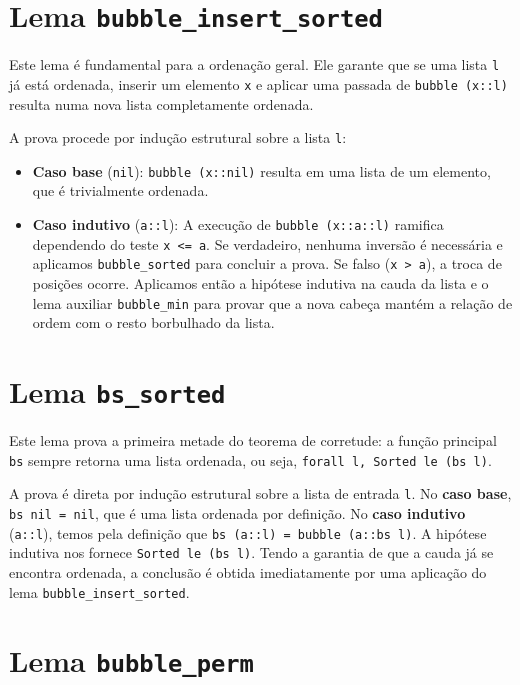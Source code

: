 \documentclass{article}
\begin{document}
\section*{Lema \texttt{bubble\_insert\_sorted}}

Este lema é fundamental para a ordenação geral. Ele garante que se uma lista
\texttt{l} já está ordenada, inserir um elemento \texttt{x} e aplicar uma
passada de \texttt{bubble (x::l)} resulta numa nova lista completamente
ordenada.

A prova procede por indução estrutural sobre a lista \texttt{l}:
\begin{itemize}
  \item \textbf{Caso base} (\texttt{nil}): \texttt{bubble (x::nil)} resulta
        em uma lista de um elemento, que é trivialmente ordenada.
  \item \textbf{Caso indutivo} (\texttt{a::l}): A execução de
        \texttt{bubble (x::a::l)} ramifica dependendo do teste \texttt{x <= a}.
        Se verdadeiro, nenhuma inversão é necessária e aplicamos
        \texttt{bubble\_sorted} para concluir a prova. Se falso (\texttt{x > a}),
        a troca de posições ocorre. Aplicamos então a hipótese indutiva na
        cauda da lista e o lema auxiliar \texttt{bubble\_min} para provar que
        a nova cabeça mantém a relação de ordem com o resto borbulhado da lista.
\end{itemize}

\section*{Lema \texttt{bs\_sorted}}

Este lema prova a primeira metade do teorema de corretude: a função principal
\texttt{bs} sempre retorna uma lista ordenada, ou seja,
\texttt{forall l, Sorted le (bs l)}.

A prova é direta por indução estrutural sobre a lista de entrada \texttt{l}. 
No \textbf{caso base}, \texttt{bs nil = nil}, que é uma lista ordenada por
definição. 
No \textbf{caso indutivo} (\texttt{a::l}), temos pela definição que
\texttt{bs (a::l) = bubble (a::bs l)}. A hipótese indutiva nos fornece
\texttt{Sorted le (bs l)}. Tendo a garantia de que a cauda já se encontra
ordenada, a conclusão é obtida imediatamente por uma aplicação do lema
\texttt{bubble\_insert\_sorted}.

\section*{Lema \texttt{bubble\_perm}}
\end{document}
